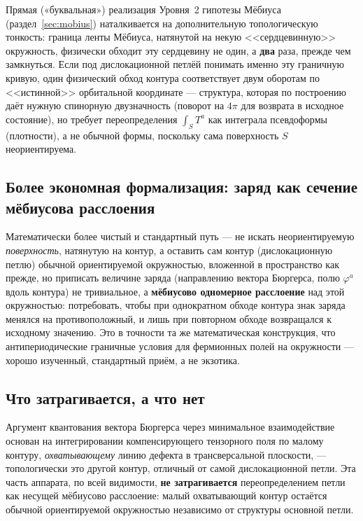 \documentclass[12pt,a4paper]{article}
\begin{document}
Прямая («буквальная») реализация Уровня~2 гипотезы Мёбиуса
(раздел~\ref{sec:mobius}) наталкивается на дополнительную топологическую
тонкость: граница ленты Мёбиуса, натянутой на некую <<сердцевинную>>
окружность, физически обходит эту сердцевину не один, а \textbf{два}
раза, прежде чем замкнуться. Если под дислокационной петлёй понимать
именно эту граничную кривую, один физический обход контура
соответствует двум оборотам по <<истинной>> орбитальной координате ---
структура, которая по построению даёт нужную спинорную двузначность
(поворот на $4\pi$ для возврата в исходное состояние), но требует
переопределения $\int_S T^a$ как интеграла псевдоформы (плотности), а не
обычной формы, поскольку сама поверхность $S$ неориентируема.

\subsection{Более экономная формализация: заряд как сечение мёбиусова расслоения}

Математически более чистый и стандартный путь --- не искать
неориентируемую \emph{поверхность}, натянутую на контур, а оставить сам
контур (дислокационную петлю) обычной ориентируемой окружностью,
вложенной в пространство как прежде, но приписать величине заряда
(направлению вектора Бюргерса, полю $\varphi^a$ вдоль контура) не
тривиальное, а \textbf{мёбиусово одномерное расслоение} над этой
окружностью: потребовать, чтобы при однократном обходе контура знак
заряда менялся на противоположный, и лишь при повторном обходе
возвращался к исходному значению. Это в точности та же математическая
конструкция, что антипериодические граничные условия для фермионных
полей на окружности --- хорошо изученный, стандартный приём, а не
экзотика.

\subsection{Что затрагивается, а что нет}

Аргумент квантования вектора Бюргерса через минимальное взаимодействие
\cite{Braginsky2018,Braginsky2016} основан на интегрировании
компенсирующего тензорного поля по малому контуру, \emph{охватывающему}
линию дефекта в трансверсальной плоскости, --- топологически это другой
контур, отличный от самой дислокационной петли. Эта часть аппарата,
по всей видимости, \textbf{не затрагивается} переопределением петли как
несущей мёбиусово расслоение: малый охватывающий контур остаётся
обычной ориентируемой окружностью независимо от структуры основной
петли.
\end{document}
